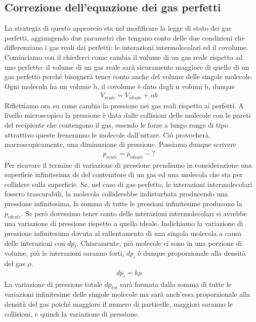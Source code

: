 \documentclass[10pt,a4paper]{article}
\begin{document}
\subsection{Correzione dell'equazione dei gas perfetti}
La strategia di questo approccio sta nel modificare la legge di stato dei gas perfetti, aggiungendo due parametri che tengano conto delle due condizioni che differenziano i gas reali dai perfetti: le interazioni intermolecolari ed il covolume. Cominciamo con il chiederci come cambia il volume di un gas reale rispetto ad uno perfetto: il volume di un gas reale sarà sicuramente maggiore di quello di un gas perfetto perché bisognerà tener conto anche del volume delle singole molecole. Ogni molecola ha un volume b, il covolume è dato dagli n volumi b, dunque
\begin{align*}
V_{reale} = V_{ideale}+ nb
\end{align*}
Riflettiamo ora su come cambia la pressione nei gas reali rispetto ai perfetti. A livello microscopico la pressione è data dalle collisioni delle molecole con le pareti del recipiente che contengono il gas, essendo le forze a lungo range di tipo attrattivo queste freneranno le molecole dall'urtare. Ciò provocherà, macroscopicamente, una diminuzione di pressione. Possiamo dunque scrivere
\begin{align*}
	p_{reale} = p_{ideale} - ?
\end{align*}
Per ricavare il termine di variazione di pressione prendiamo in considerazione una superficie infinitesima ds del contenitore di un gas ed una molecola che sta per collidere sulla superficie. Se, nel caso di gas perfetto, le interazioni intermolecolari fossero trascurabili, la molecola colliderebbe indisturbata producendo una pressione infinitesima, la somma di tutte le pressioni infinitesime producono la $p_{ideale}$. Se però dovessimo tener conto delle interazioni intermolecolari si avrebbe una variazione di pressione rispetto a quella ideale. Indichiamo la variazione di pressione infinitesima dovuta al rallentamento di una singola molecola a causa delle interazioni con $dp_i$. Chiaramente, più molecole ci sono in una porzione di volume, più le interazioni saranno forti, $dp_i$ è dunque proporzionale alla densità del gas $\rho$. 
\begin{align*}
dp_i = k \rho
\end{align*}
La variazione di pressione totale $dp_{tot}$ sarà formata dalla somma di tutte le variazioni infinitesime delle singole molecole ma sarà anch'essa proporzionale alla densità del gas poiché maggiore il numero di particelle, maggiori saranno le collisioni, e quindi la variazione di pressione. 
\end{document}
